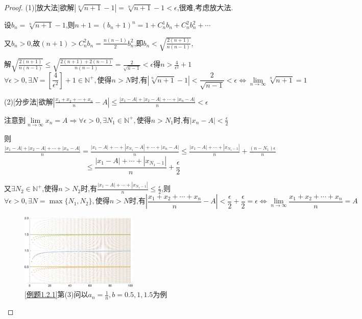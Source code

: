 \begin{proof}
    (1)[放大法]欲解$|\sqrt[n]{n+1}-1|=\sqrt[n]{n+1}-1<\epsilon$,很难,考虑放大法.

    设$b_n=\sqrt[n]{n+1}-1$,则$n+1=(b_n+1)^n=1+C_n^1b_n+C_n^2b_n^2+\cdots $

    又$b_n>0$,故$(n+1)>C_n^2b_n=\frac{n(n-1)}{2}b_n^2$,即$b_n< \sqrt{\frac{2(n+1)}{n(n-1)}}$,

    解$\sqrt{\frac{2(n+1)}{n(n-1)}}\le\sqrt{\frac{2(n+1)+2(n-1)}{n(n-1)}}=\frac{2}{\sqrt{n-1}}<\epsilon$得$n>\frac{4}{\epsilon^2}+1$
    \begin{equation*}
        \forall \epsilon>0,\exists N=[\frac{4}{\epsilon^2}]+1 \in \mathbb{N}^+,\mbox{使得}n>N\mbox{时,有}|\sqrt[n]{n+1}-1|<\frac{2}{\sqrt{n-1}}<\epsilon\Longleftrightarrow \lim\limits_{n\to \infty}\sqrt[n]{n+1}=1
    \end{equation*}

    (2)[分步法]欲解$|\frac{x_1+x_2+\cdots+x_n}{n}-A|\le \frac{|x_1-A|+|x_2-A|+\cdots+|x_n-A|}{n}<\epsilon$

    注意到$\lim\limits_{n\to \infty} x_n=A \Longrightarrow\forall \epsilon>0,\exists N_1 \in \mathbb{N}^+,\mbox{使得}n>N_1\mbox{时,有}|x_n-A|<\frac{\epsilon}{2}$

    则$\frac{|x_1-A|+|x_2-A|+\cdots+|x_n-A|}{n}=\frac{|x_1-A|+\cdots+|x_{N_1}-A|+\cdots+|x_n-A|}{n} \le \frac{|x_1-A|+\cdots+|x_{N_1-1}|}{n}+\frac{(n-N_1)\epsilon}{n}$
    $$\le \frac{|x_1-A|+\cdots+|x_{N_1-1}|}{n}+\frac{\epsilon}{2}$$

    又$\exists N_2\in \mathbb{N}^+$,使得$n>N_2$时,有$\frac{|x_1-A|+\cdots+|x_{N_1-1}|}{n}\le \frac{\epsilon}{2}$,则
    \begin{equation*}
        \forall \epsilon>0,\exists N=\max \{N_1,N_2\},\mbox{使得}n>N\mbox{时,有}|\frac{x_1+x_2+\cdots+x_n}{n}-A|<\frac{\epsilon}{2}+\frac{\epsilon}{2}=\epsilon\Longleftrightarrow \lim\limits_{n\to \infty} \frac{x_1+x_2+\cdots+x_n}{n}=A
    \end{equation*}

    \begin{figure}[htbp!]
        \centering
        \includegraphics[width=0.5\textwidth]{../image/点列问题}
        \caption{\cref{例题1.2.1}第(3)问以$a_n=\frac{1}{n},b=0.5,1,1.5$为例}
    \end{figure}


\end{proof}
